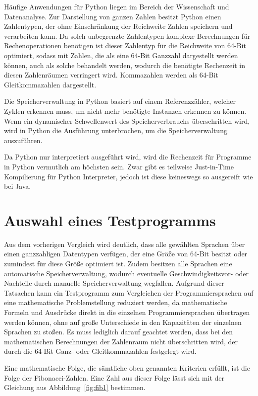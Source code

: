 \documentclass[11pt, parskip=half]{scrartcl}       %
\begin{document}
Häufige Anwendungen für Python liegen im Bereich der Wissenschaft und Datenanalyse.
Zur Darstellung von ganzen Zahlen besitzt Python einen Zahlentypen, der ohne Einschränkung der Reichweite Zahlen speichern und verarbeiten kann.
Da solch unbegrenzte Zahlentypen komplexe Berechnungen für Rechenoperationen benötigen ist dieser Zahlentyp für die Reichweite von 64-Bit optimiert, sodass mit Zahlen, die als eine 64-Bit Ganzzahl dargestellt werden können, auch als solche behandelt werden, wodurch die benötigte Rechenzeit in diesen Zahlenräumen verringert wird.\cite{github_python_long}
Kommazahlen werden als 64-Bit Gleitkommazahlen dargestellt.

Die Speicherverwaltung in Python basiert auf einem Referenzzähler, welcher Zyklen erkennen muss, um nicht mehr benötigte Instanzen erkennen zu können.
Wenn ein dynamischer Schwellenwert des Speicherverbrauchs überschritten wird, wird in Python die Ausführung unterbrochen, um die Speicherverwaltung auszuführen.

Da Python nur interpretiert ausgeführt wird, wird die Rechenzeit für Programme in Python vermutlich am höchsten sein.
Zwar gibt es teilweise Just-in-Time Kompilierung für Python Interpreter, jedoch ist diese keineswegs so ausgereift wie bei Java.


\section{Auswahl eines Testprogramms}

Aus dem vorherigen Vergleich wird deutlich, dass alle gewählten Sprachen über einen ganzzahligen Datentypen verfügen, der eine Größe von 64-Bit besitzt oder zumindest für diese Größe optimiert ist.
Zudem besitzen alle Sprachen eine automatische Speicherverwaltung, wodurch eventuelle Geschwindigkeitsvor- oder Nachteile durch manuelle Speicherverwaltung wegfallen.
Aufgrund dieser Tatsachen kann ein Testprogramm zum Vergleichen der Programmiersprachen auf eine mathematische Problemstellung reduziert werden, da mathematische Formeln und Ausdrücke direkt in die einzelnen Programmiersprachen übertragen werden können, ohne auf große Unterschiede in den Kapazitäten der einzelnen Sprachen zu stoßen.
Es muss lediglich darauf geachtet werden, dass bei den mathematischen Berechnungen der Zahlenraum nicht überschritten wird, der durch die 64-Bit Ganz- oder Gleitkommazahlen festgelegt wird.


Eine mathematische Folge, die sämtliche oben genannten Kriterien erfüllt, ist die Folge der Fibonacci-Zahlen.
Eine Zahl aus dieser Folge lässt sich mit der Gleichung aus Abbildung~\ref{fig:fib1} bestimmen.
\end{document}
